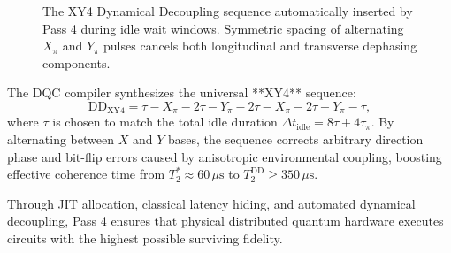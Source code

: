 \begin{figure}[htbp]
    \centering
    \caption{The XY4 Dynamical Decoupling sequence automatically inserted by Pass 4 during idle wait windows. Symmetric spacing of alternating $X_\pi$ and $Y_\pi$ pulses cancels both longitudinal and transverse dephasing components.}
    \label{fig:xy4_sequence}
\end{figure}

The DQC compiler synthesizes the universal **XY4** sequence:
\begin{equation}
    \text{DD}_{\text{XY4}} = \tau - X_\pi - 2\tau - Y_\pi - 2\tau - X_\pi - 2\tau - Y_\pi - \tau,
    \label{eq:xy4_formula}
\end{equation}
where $\tau$ is chosen to match the total idle duration $\Delta t_{\text{idle}} = 8\tau + 4\tau_\pi$. By alternating between $X$ and $Y$ bases, the sequence corrects arbitrary direction phase and bit-flip errors caused by anisotropic environmental coupling, boosting effective coherence time from $T_2^* \approx 60\,\mu\text{s}$ to $T_2^{\text{DD}} \ge 350\,\mu\text{s}$.

Through JIT allocation, classical latency hiding, and automated dynamical decoupling, Pass 4 ensures that physical distributed quantum hardware executes circuits with the highest possible surviving fidelity.

